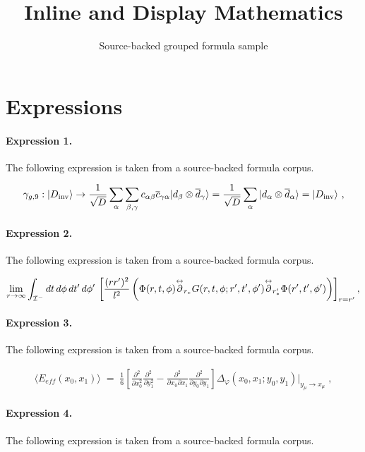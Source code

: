 \documentclass[11pt]{article}
\title{Inline and Display Mathematics}
\author{Source-backed grouped formula sample}
\date{}
\begin{document}
\maketitle
\section{Expressions}
\paragraph{Expression 1.} The following expression is taken from a source-backed formula corpus.

\begin{align*}\gamma_{g,9}:|D_{\rm inv}\rangle \rightarrow {1\over\sqrt{D}} \sum_\alpha \sum_{\beta,\gamma} c_{\alpha\beta} {\overline c}_{\gamma\alpha} |d_\beta\otimes{\overline d}_\gamma \rangle={1\over \sqrt{D}} \sum_\alpha |d_\alpha\otimes{\overline d}_\alpha\rangle=|D_{\rm inv}\rangle~,\end{align*}

\paragraph{Expression 2.} The following expression is taken from a source-backed formula corpus.

\begin{align*}\lim_{r\to\infty}\int_{{\cal I}^-} dt\, d\phi\, dt'\, d\phi'\,\left[\frac{(rr')^2}{l^2}\left(\Phi(r,t,\phi){\buildrel \leftrightarrow \over \partial_{r_{\ast}}}G(r,t,\phi; r',t',\phi'){\buildrel \leftrightarrow \over \partial_{r'_{\ast}}}\Phi(r',t',\phi')\right)\right]_{r=r'}, \end{align*}

\paragraph{Expression 3.} The following expression is taken from a source-backed formula corpus.

\begin{align*}\langle E_{eff}(x_0,x_1) \rangle \;=\; \frac{1}{6} \left[\frac{\partial^2}{\partial x_0^2}\frac{\partial^2}{\partial y_1^2} -\frac{\partial^2}{\partial x_0 \partial x_1} \frac{\partial^2}{\partial y_0 \partial y_1}\right] \Delta_\varphi(x_0,x_1;y_0, y_1)|_{y_\mu \to x_\mu} \;,\end{align*}

\paragraph{Expression 4.} The following expression is taken from a source-backed formula corpus.
\end{document}
